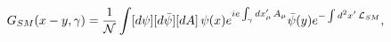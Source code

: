 \begin{equation}
G_{SM}(x-y,\gamma)=\frac{1}{\cal N}\int [d\psi][d\bar{\psi}][dA]\,
\psi(x)e^{ie\int_\gamma dx_\mu'\, A_\mu} \bar{\psi}(y) e^{-\int d^2x'\, {\cal L}_{SM}},
\label{corrSMinvg}
\end{equation}

